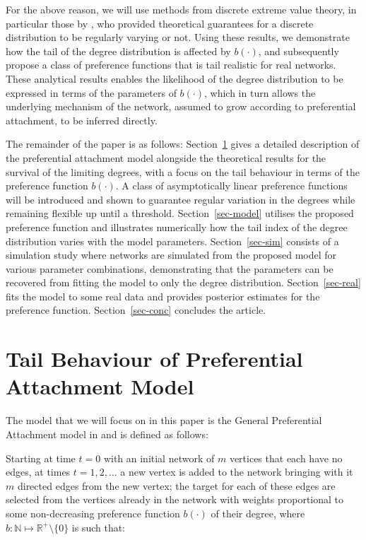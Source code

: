 \documentclass[
  sn-basic,
]{sn-jnl}
\theoremstyle{plain}
\theoremstyle{plain}
\theoremstyle{remark}
\begin{document}
For the above reason, we will use methods from discrete extreme value
theory, in particular those by \citet{shimura12}, who provided
theoretical guarantees for a discrete distribution to be regularly
varying or not. Using these results, we demonstrate how the tail of the
degree distribution is affected by \(b(\cdot)\), and subsequently
propose a class of preference functions that is tail realistic for real
networks. These analytical results enables the likelihood of the degree
distribution to be expressed in terms of the parameters of \(b(\cdot)\),
which in turn allows the underlying mechanism of the network, assumed to
grow according to preferential attachment, to be inferred directly.

The remainder of the paper is as follows: Section~\ref{sec-tail} gives a
detailed description of the preferential attachment model alongside the
theoretical results for the survival of the limiting degrees, with a
focus on the tail behaviour in terms of the preference function
\(b(\cdot)\). A class of asymptotically linear preference functions will
be introduced and shown to guarantee regular variation in the degrees
while remaining flexible up until a threshold. Section~\ref{sec-model}
utilises the proposed preference function and illustrates numerically
how the tail index of the degree distribution varies with the model
parameters. Section~\ref{sec-sim} consists of a simulation study where
networks are simulated from the proposed model for various parameter
combinations, demonstrating that the parameters can be recovered from
fitting the model to only the degree distribution.
Section~\ref{sec-real} fits the model to some real data and provides
posterior estimates for the preference function. Section~\ref{sec-conc}
concludes the article.

\newpage

\section{Tail Behaviour of Preferential Attachment
Model}\label{sec-tail}

The model that we will focus on in this paper is the General
Preferential Attachment model in \citet{rudas07} and is defined as
follows:

Starting at time \(t=0\) with an initial network of \(m\) vertices that
each have no edges, at times \(t=1,2,\ldots\) a new vertex is added to
the network bringing with it \(m\) directed edges from the new vertex;
the target for each of these edges are selected from the vertices
already in the network with weights proportional to some non-decreasing
preference function \(b(\cdot)\) of their degree, where
\(b: \mathbb N \mapsto \mathbb R^+\setminus\{0\}\) is such that:
\end{document}
